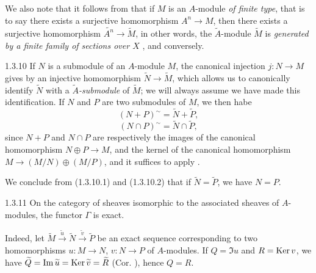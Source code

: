 We also note that it follows from  that if $M$ is an $A$-module \emph{of
finite type}, that is to say there exists a surjective homomorphism $A^n\to M$, then there
exists a surjective homomorphism $\widetilde{A^n}\to\widetilde{M}$, in other words, the
$\widetilde{A}$-module $\widetilde{M}$ is \emph{generated by a finite family of sections over
$X$} , and conversely.

\begin{env}{1.3.10}
\label{env-1.1.3.10}
If $N$ is a submodule of an $A$-module $M$, the canonical injection $j:N\to M$ gives by
 an injective homomorphism $\widetilde{N}\to\widetilde{M}$, which allows us
to canonically identify $\widetilde{N}$ with a \emph{$\widetilde{A}$-submodule} of
$\widetilde{M}$; we will always assume we have made this identification. If $N$ and $P$ are
two submodules of $M$, we then habe
\[
  (N+P)^\sim=\widetilde{N}+\widetilde{P},
  \tag{1.3.10.1}
\]
\[
  (N\cap P)^\sim=\widetilde{N}\cap\widetilde{P},
  \tag{1.3.10.2}
\]
since $N+P$ and $N\cap P$ are respectively the images of the canonical homomorphism
$N\oplus P\to M$, and the kernel of the canonical homomorphism $M\to(M/N)\oplus(M/P)$, and
it suffices to apply .

We conclude from (1.3.10.1) and (1.3.10.2) that if $\widetilde{N}=\widetilde{P}$, we have
$N=P$.
\end{env}

\begin{envs}[Corollary]{1.3.11}
\label{cor-1.1.3.11}
On the category of sheaves isomorphic to the associated sheaves of $A$-modules, the functor
$\Gamma$ is exact.
\end{envs}

Indeed, let
$\widetilde{M}\xrightarrow{\widetilde{u}}\widetilde{N}
\xrightarrow{\widetilde{v}}\widetilde{P}$ be an exact sequence corresponding to two
homomorphisms $u:M\to N$, $v:N\to P$ of $A$-modules. If $Q=\Im u$ and $R={\mathop{\mathrm{Ker}}\nolimits}\, v$, we have
$\widetilde{Q}={\mathop{\mathrm{Im}}\nolimits}\,\widetilde{u}={\mathop{\mathrm{Ker}}\nolimits}\,\widetilde{v}=\widetilde{R}$ (Cor. ),
hence $Q=R$.

